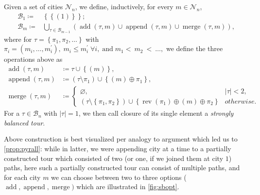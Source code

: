 \documentclass[index=totoc,bibliography=totoc]{scrartcl}
\numberwithin{equation}{section}
\numberwithin{figure}{section}
\numberwithin{table}{section}
\let\defstyle\itshape
\begin{document}
\begin{define}
\label{def:sbtour}
  Given a set of cities $\mathcal{N}_n$, we define, inductively,
  for every $m \in \mathcal{N}_n$,
  \begin{align*}
    \mathcal{B}_1 \coloneqq & \left\{ \left\{\left(1\right)\right\} \right\};
    \\
    \mathcal{B}_m \coloneqq & \bigcup_{\tau \in \mathcal{B}_{m-1}}
      \left(
      \operatorname{add}\left(\tau,m\right)
      \cup
      \operatorname{append}\left(\tau,m\right)
      \cup
      \operatorname{merge}\left(\tau,m\right)
      \right),
  \end{align*}
  where for $ \tau = \left\{ \pi_1, \pi_2, \ldots \right\} $ with
  $
    \pi_i = \left(m_i,\ldots,m_i^\prime\right), \;
    m_i \leq m_i^\prime \; \forall i, \;
    \text{and} \; m_1 <~ m_2~ <~\ldots,
  $
  we define the three operations above as
  \begin{align*}
    \operatorname{add}\left(\tau,m\right)
    & \coloneqq \tau \cup \left\{ \left(m\right) \right\},\\
    \operatorname{append}\left(\tau,m\right)
    & \coloneqq \left( \tau \setminus \pi_1 \right) \cup \left\{ \left(m\right) \oplus \pi_1 \right\},\\
    \operatorname{merge}\left(\tau,m\right)
    & \coloneqq
    \begin{cases}
      \varnothing, & \lvert\tau\rvert < 2,
      \\
      \left( \tau \setminus \left\{\pi_1,\pi_2\right\} \right)
      \cup \left\{ \operatorname{rev}\left(\pi_1\right) \oplus \left(m\right) \oplus \pi_2 \right\}
      & otherwise.
    \end{cases}
  \end{align*}
  For a $\tau \in \mathcal{B}_n$ with $\left|\tau\right| = 1$,
  we then call closure of its single element a {\defstyle strongly balanced tour}.
\end{define}

Above construction is best visualized per analogy to argument which led us
to \cref{prop:pyrall}: while in latter, we were appending city at a time to
a partially constructed tour which consisted of two (or one, if we joined
them at city $1$) paths, here such a partially constructed tour can consist of
multiple paths, and for each city $m$ we can choose between two to three
options ($\operatorname{add}, \operatorname{append}, \operatorname{merge})$
which are illustrated in \cref{fig:sbopt}.
\end{document}
